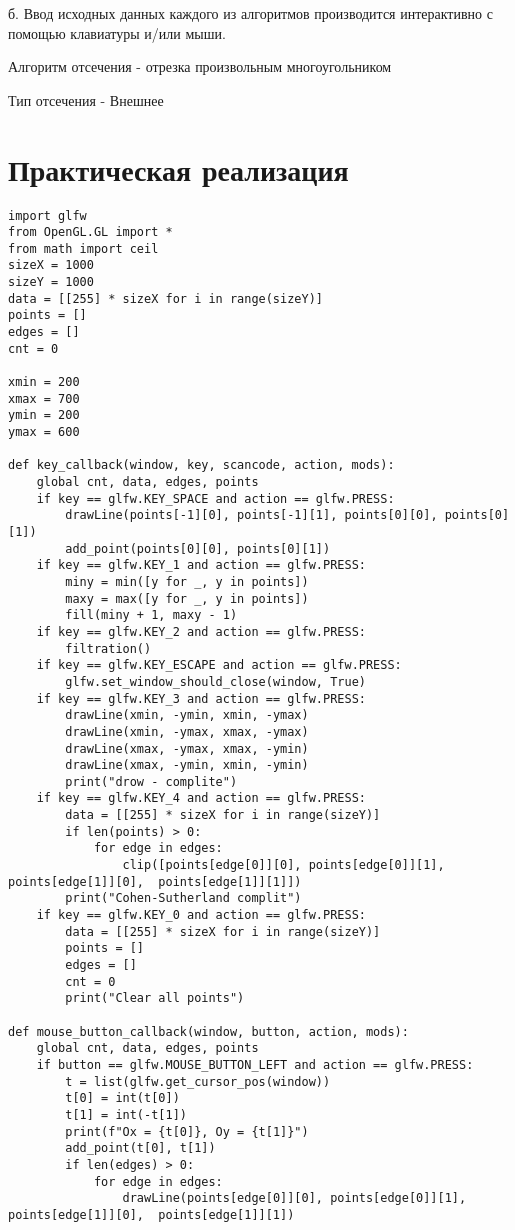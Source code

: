 \documentclass[a4paper, 14pt]{extarticle}
\begin{document}
б. Ввод исходных данных каждого из алгоритмов производится интерактивно с помощью клавиатуры и/или мыши.

Алгоритм отсечения - отрезка произвольным многоугольником

Тип отсечения - Внешнее
\pagebreak
\section{Практическая реализация}
\begin{verbatim}
import glfw
from OpenGL.GL import *
from math import ceil
sizeX = 1000
sizeY = 1000
data = [[255] * sizeX for i in range(sizeY)]
points = []
edges = []
cnt = 0

xmin = 200
xmax = 700
ymin = 200
ymax = 600

def key_callback(window, key, scancode, action, mods):
    global cnt, data, edges, points
    if key == glfw.KEY_SPACE and action == glfw.PRESS:
        drawLine(points[-1][0], points[-1][1], points[0][0], points[0][1])
        add_point(points[0][0], points[0][1])
    if key == glfw.KEY_1 and action == glfw.PRESS:
        miny = min([y for _, y in points])
        maxy = max([y for _, y in points])
        fill(miny + 1, maxy - 1)
    if key == glfw.KEY_2 and action == glfw.PRESS:
        filtration()
    if key == glfw.KEY_ESCAPE and action == glfw.PRESS:
        glfw.set_window_should_close(window, True)
    if key == glfw.KEY_3 and action == glfw.PRESS:
        drawLine(xmin, -ymin, xmin, -ymax)
        drawLine(xmin, -ymax, xmax, -ymax)
        drawLine(xmax, -ymax, xmax, -ymin)
        drawLine(xmax, -ymin, xmin, -ymin)
        print("drow - complite")
    if key == glfw.KEY_4 and action == glfw.PRESS:
        data = [[255] * sizeX for i in range(sizeY)]
        if len(points) > 0:
            for edge in edges:
                clip([points[edge[0]][0], points[edge[0]][1], points[edge[1]][0],  points[edge[1]][1]])
        print("Cohen-Sutherland complit")
    if key == glfw.KEY_0 and action == glfw.PRESS:
        data = [[255] * sizeX for i in range(sizeY)]
        points = []
        edges = []
        cnt = 0
        print("Clear all points")

def mouse_button_callback(window, button, action, mods):
    global cnt, data, edges, points
    if button == glfw.MOUSE_BUTTON_LEFT and action == glfw.PRESS:
        t = list(glfw.get_cursor_pos(window))
        t[0] = int(t[0])
        t[1] = int(-t[1])
        print(f"Ox = {t[0]}, Oy = {t[1]}")
        add_point(t[0], t[1])
        if len(edges) > 0:
            for edge in edges:
                drawLine(points[edge[0]][0], points[edge[0]][1], points[edge[1]][0],  points[edge[1]][1])


\end{verbatim}
\end{document}
